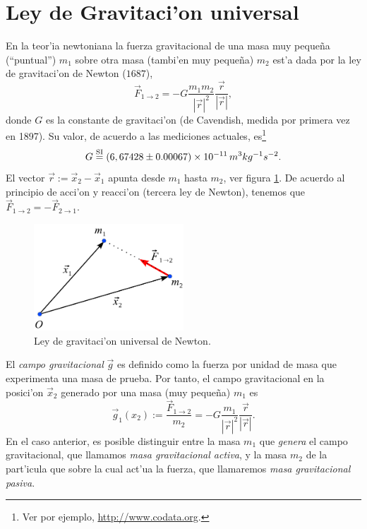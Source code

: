 \section{Ley de Gravitaci'on universal}
En la teor'ia newtoniana la fuerza gravitacional de una masa muy peque\~na (``puntual'') $m_1$ sobre otra masa (tambi'en muy peque\~na) $m_2$
est'a dada por la ley de gravitaci'on de Newton ($1687$),
\begin{equation}
\vec{F}_{1\rightarrow 2}=-G\frac{m_1m_2}{|\vec{r}|^2}\frac{\vec{r}}{|\vec{r}|},
\end{equation}
donde $G$ es la constante de gravitaci'on (de Cavendish, medida por primera vez en 1897). Su valor, de acuerdo a las mediciones actuales, es\footnote{Ver por ejemplo, \url{http://www.codata.org}.}
\begin{equation}
G\stackrel{\rm SI}{=}(6,674 28\pm 0.000 67)\times 10^{-11}\, m^3kg^{-1}s^{-2}.
\end{equation}
El vector $\vec{r}:=\vec{x}_2-\vec{x}_1$ apunta desde $m_1$ hasta $m_2$, ver figura \ref{lguN}. De acuerdo al principio de acci'on y reacci'on (tercera ley de Newton),
tenemos que $\vec{F}_{1\rightarrow 2}=-\vec{F}_{2\rightarrow 1}$.
\begin{center}
\begin{figure}[H]
\centerline{\includegraphics[height=4cm]{fig/fig-ley-gravitacion-Newton.pdf}}
\caption{Ley de gravitaci'on universal de Newton.}
\label{lguN}
\end{figure}
\end{center}
El \textit{campo gravitacional} $\vec{g}$ es definido como la fuerza por unidad de masa
que experimenta una masa de prueba. Por tanto, el campo gravitacional en la posici'on $\vec{x}_2$ generado por una masa (muy peque\~na) $m_1$ es
\begin{equation}
\vec{g}_1(x_2):=\frac{\vec{F}_{1\to 2}}{m_2}=-G\frac{m_1}{|\vec{r}|^2}\frac{\vec{r}}{|\vec{r}|}.
\end{equation}
En el caso anterior, es posible distinguir entre la masa $m_1$ que
\textit{genera} el campo gravitacional, que llamamos \textit{masa gravitacional
activa}, y la masa $m_2$ de la part'icula que sobre la cual act'ua la fuerza, que
llamaremos \textit{masa gravitacional pasiva}.

